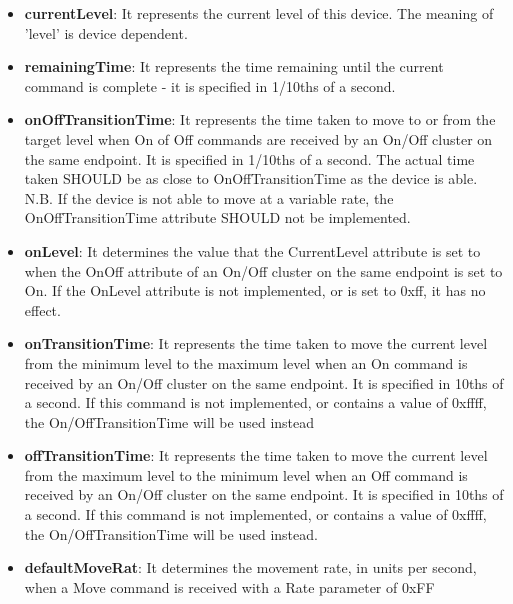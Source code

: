\begin{itemize}
\item \textbf{currentLevel}: It represents the current level of this device. The meaning of 'level' is device dependent.
\item \textbf{remainingTime}: It represents the time remaining until the current command is complete - it is specified in 1/10ths of a second.
\item \textbf{onOffTransitionTime}: It represents the time taken to move to or from the target level when On of Off commands are received by an On/Off cluster on the same endpoint. It is specified in 1/10ths of a second. The actual time taken SHOULD be as close to OnOffTransitionTime as the device is able. N.B. If the device is not able to move at a variable rate, the OnOffTransitionTime attribute SHOULD not be implemented.
\item \textbf{onLevel}: It determines the value that the CurrentLevel attribute is set to when the OnOff attribute of an On/Off cluster on the same endpoint is set to On. If the OnLevel attribute is not implemented, or is set to 0xff, it has no effect.
\item \textbf{onTransitionTime}: It represents the time taken to move the current level from the minimum level to the maximum level when an On command is received by an On/Off cluster on the same endpoint. It is specified in 10ths of a second. If this command is not implemented, or contains a value of 0xffff, the On/OffTransitionTime will be used instead
\item \textbf{offTransitionTime}: It represents the time taken to move the current level from the maximum level to the minimum level when an Off command is received by an On/Off cluster on the same endpoint. It is specified in 10ths of a second. If this command is not implemented, or contains a value of 0xffff, the On/OffTransitionTime will be used instead.
\item \textbf{defaultMoveRat}: It determines the movement rate, in units per second, when a Move command is received with a Rate parameter of 0xFF
\end{itemize}

